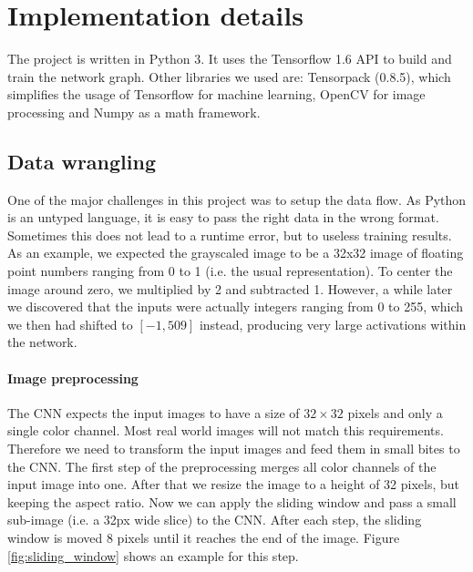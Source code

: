 \documentclass{utue} %
\begin{document}
\section{Implementation details}
The project is written in Python 3. It uses the Tensorflow 1.6 API to build and train the network graph. Other libraries we used are: Tensorpack (0.8.5), which simplifies the usage of Tensorflow for machine learning, OpenCV for image processing and Numpy as a math framework.

\subsection{Data wrangling}
One of the major challenges in this project was to setup the data flow. As Python is an untyped language, it is easy to pass the right data in the wrong format. Sometimes this does not lead to a runtime error, but to useless training results. As an example, we expected the grayscaled image to be a 32x32 image of floating point numbers ranging from 0 to 1 (i.e. the usual representation). To center the image around zero, we multiplied by 2 and subtracted 1. However, a while later we discovered that the inputs were actually integers ranging from 0 to 255, which we then had shifted to $[-1, 509]$ instead, producing very large activations within the network.

\paragraph{Image preprocessing}
The CNN expects the input images to have a size of $32\times32$ pixels and only a single color channel. Most real world images will not match this requirements. Therefore we need to transform the input images and feed them in small bites to the CNN. The first step of the preprocessing merges all color channels of the input image into one. After that we resize the image to a height of 32 pixels, but keeping the aspect ratio. Now we can apply the sliding window and pass a small sub-image (i.e. a 32px wide slice) to the CNN. After each step, the sliding window is moved 8 pixels until it reaches the end of the image. Figure \ref{fig:sliding_window} shows an example for this step.
\end{document}
